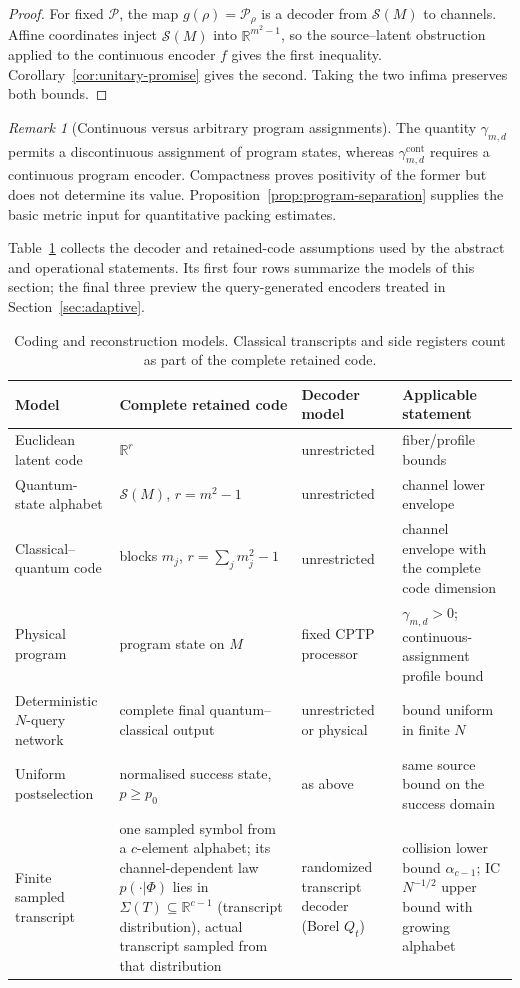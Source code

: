 \documentclass[11pt,a4paper]{article}
\theoremstyle{definition}
\theoremstyle{plain}
\theoremstyle{remark}
\newtheorem{remark}[theorem]{Remark}
\newcommand{\Sstate}{\mathcal{S}}
\begin{document}
\begin{proof}
For fixed $\mathcal P$, the map
$g(\rho)=\mathcal P_\rho$ is a decoder from $\Sstate(M)$ to channels.
Affine coordinates inject $\Sstate(M)$ into $\mathbb R^{m^2-1}$, so the
source--latent obstruction applied to the continuous encoder $f$ gives the
first inequality. Corollary~\ref{cor:unitary-promise} gives the second.
Taking the two infima preserves both bounds.
\end{proof}

\begin{remark}[Continuous versus arbitrary program assignments]
The quantity $\gamma_{m,d}$ permits a discontinuous assignment of program
states, whereas $\gamma^{\mathrm{cont}}_{m,d}$ requires a continuous program
encoder. Compactness proves positivity of the former but does not determine
its value. Proposition~\ref{prop:program-separation} supplies the basic
metric input for quantitative packing estimates.
\end{remark}

Table~\ref{tab:resource-models} collects the decoder and retained-code
assumptions used by the abstract and operational statements. Its first four
rows summarize the models of this section; the final three preview the
query-generated encoders treated in Section~\ref{sec:adaptive}.

\begin{table}[t]
\centering
\small
\setlength{\tabcolsep}{4pt}
\begin{tabular}{p{3.2cm}p{4.0cm}p{3.3cm}p{3.2cm}}
\hline
Model & Complete retained code & Decoder model & Applicable statement\\
\hline
Euclidean latent code
& $\mathbb R^r$
& unrestricted
& fiber/profile bounds\\
Quantum-state alphabet
& $\Sstate(M)$, $r=m^2-1$
& unrestricted
& channel lower envelope\\
Classical--quantum code
& blocks $m_j$, $r=\sum_jm_j^2-1$
& unrestricted
& channel envelope with the complete code dimension\\
Physical program
& program state on $M$
& fixed CPTP processor
& $\gamma_{m,d}>0$; continuous-assignment profile bound\\
Deterministic $N$-query network
& complete final quantum--classical output
& unrestricted or physical
& bound uniform in finite $N$\\
Uniform postselection
& normalised success state, $p\geq p_0$
& as above
& same source bound on the success domain\\
Finite sampled transcript
& one sampled symbol from a $c$-element alphabet; its channel-dependent law $p(\cdot|\Phi)$ lies in
$\Sigma(T)\subseteq\mathbb R^{c-1}$ (transcript distribution), actual transcript sampled from that distribution
& randomized transcript decoder (Borel $Q_t$)
& collision lower bound $\alpha_{c-1}$; IC $N^{-1/2}$ upper bound with growing alphabet\\
\hline
\end{tabular}
\caption{Coding and reconstruction models. Classical transcripts and side
registers count as part of the complete retained code.}
\label{tab:resource-models}
\end{table}
\end{document}
